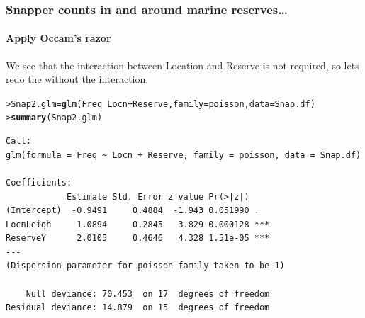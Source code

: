 \documentclass{beamer}\usepackage[]{graphicx}\usepackage[]{xcolor}
\makeatletter
\newcommand{\hlopt}[1]{\textcolor[rgb]{0,0,0}{#1}}%
\newcommand{\hlstd}[1]{\textcolor[rgb]{0.345,0.345,0.345}{#1}}%
\newcommand{\hlkwb}[1]{\textcolor[rgb]{0.69,0.353,0.396}{#1}}%
\newcommand{\hlkwc}[1]{\textcolor[rgb]{0.333,0.667,0.333}{#1}}%
\newcommand{\hlkwd}[1]{\textcolor[rgb]{0.737,0.353,0.396}{\textbf{#1}}}%
\newenvironment{kframe}{%
 \def\at@end@of@kframe{}%
 \ifinner\ifhmode%
  \def\at@end@of@kframe{\end{minipage}}%
  \begin{minipage}{\columnwidth}%
 \fi\fi%
 \def\FrameCommand##1{\hskip\@totalleftmargin \hskip-\fboxsep
 \colorbox{shadecolor}{##1}\hskip-\fboxsep
     \hskip-\linewidth \hskip-\@totalleftmargin \hskip\columnwidth}%
 \MakeFramed {\advance\hsize-\width
   \@totalleftmargin\z@ \linewidth\hsize
   \@setminipage}}%
 {\par\unskip\endMakeFramed%
 \at@end@of@kframe}
\newenvironment{knitrout}{}{} %
\makeatother
\begin{document}
\begin{frame}[fragile]
\frametitle{Snapper counts in and around marine reserves\ldots}
\framesubtitle{Apply Occam's razor}
We see that the interaction between Location and Reserve is not required,
so lets redo the  without the interaction.
\medskip

\begin{knitrout}\scriptsize
{}\color{fgcolor}\begin{kframe}
\begin{alltt}
\hlstd{> }\hlstd{Snap2.glm} \hlkwb{=} \hlkwd{glm}\hlstd{(Freq} \hlopt{~} \hlstd{Locn} \hlopt{+} \hlstd{Reserve,} \hlkwc{family} \hlstd{= poisson,} \hlkwc{data} \hlstd{= Snap.df)}
\hlstd{> }\hlkwd{summary}\hlstd{(Snap2.glm)}
\end{alltt}
\end{kframe}
\end{knitrout}

\begin{knitrout}\scriptsize
{}\color{fgcolor}\begin{kframe}
\begin{verbatim}
Call:
glm(formula = Freq ~ Locn + Reserve, family = poisson, data = Snap.df)

Coefficients:
            Estimate Std. Error z value Pr(>|z|)    
(Intercept)  -0.9491     0.4884  -1.943 0.051990 .  
LocnLeigh     1.0894     0.2845   3.829 0.000128 ***
ReserveY      2.0105     0.4646   4.328 1.51e-05 ***
---
(Dispersion parameter for poisson family taken to be 1)

    Null deviance: 70.453  on 17  degrees of freedom
Residual deviance: 14.879  on 15  degrees of freedom
\end{verbatim}
\end{kframe}
\end{knitrout}

\end{frame}
\end{document}

